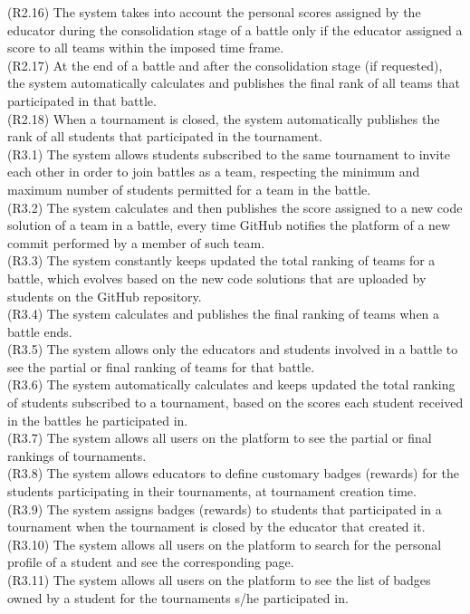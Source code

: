 (R2.16) The system takes into account the personal scores assigned by the educator during the consolidation stage of a battle only if the educator assigned a score to all teams within the imposed time frame. \\
(R2.17) At the end of a battle and after the consolidation stage (if requested), the system automatically calculates and publishes the final rank of all teams that participated in that battle.  \\
(R2.18) When a tournament is closed, the system automatically publishes the rank of all students that participated in the tournament. \\
(R3.1) The system allows students subscribed to the same tournament to invite each other in order to join battles as a team, respecting the minimum and maximum number of students permitted for a team in the battle. \\
(R3.2) The system calculates and then publishes the score assigned to a new code solution of a team in a battle, every time GitHub notifies the platform of a new commit performed by a member of such team. \\
(R3.3) The system constantly keeps updated the total ranking of teams for a battle, which evolves based on the new code solutions that are uploaded by students on the GitHub repository. \\
(R3.4) The system calculates and publishes the final ranking of teams when a battle ends. \\
(R3.5) The system allows only the educators and students involved in a battle to see the partial or final ranking of teams for that battle. \\
(R3.6) The system automatically calculates and keeps updated the total ranking of students subscribed to a tournament, based on the scores each student received in the battles he participated in. \\
(R3.7) The system allows all users on the platform to see the partial or final rankings of tournaments. \\
(R3.8)  The system allows educators to define customary badges (rewards) for the students participating in their tournaments, at tournament creation time. \\
(R3.9) The system assigns badges (rewards) to students that participated in a tournament when the tournament is closed by the educator that created it. \\
(R3.10) The system allows all users on the platform to search for the personal profile of a student and see the corresponding page. \\
(R3.11) The system allows all users on the platform to see the list of badges owned by a student for the tournaments s/he participated in. \\
